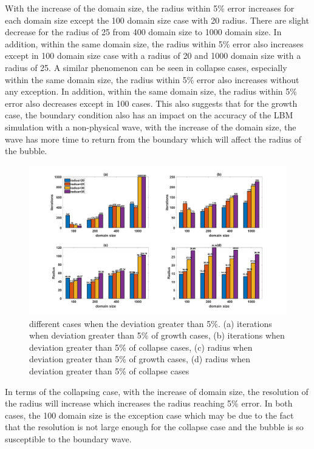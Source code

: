 \documentclass[review]{elsarticle}
\begin{document}
With the increase of the domain size, the radius within 5\% error increases for each domain size except the 100 domain size case with 20 radius. There are slight decrease for the radius of 25 from 400 domain size to 1000 domain size. In addition, within the same domain size, the radius within 5\% error also increases except in 100 domain size case with a radius of 20 and 1000 domain size with a radius of 25. 
A similar phenomenon can be seen in collapse cases, especially within the same domain size, the radius within 5\% error also increases without any exception. In addition, within the same domain size, the radius within 5\% error also decreases except in 100 cases. This also suggests that for the growth case, the boundary condition also has an impact on the accuracy of the LBM simulation with a non-physical wave, with the increase of the domain size, the wave has more time to return from the boundary which will affect the radius of the bubble.
 
\begin{figure}[htp]
	\centering
	\includegraphics[width=1\textwidth,height=0.5\textheight]{chart}
	\caption{different cases when the deviation greater than 5\%. (a) iterations when deviation greater than 5\% of growth cases, (b) iterations when deviation greater than 5\% of collapse cases, (c) radius when deviation greater than 5\% of growth cases, (d) radius when deviation greater than 5\% of collapse cases }
	\label{fig:chart}
\end{figure}
In terms of the collapsing case, with the increase of domain size, the resolution of the radius will increase which increases the radius reaching 5\% error. In both cases, the 100 domain size is the exception case which may be due to the fact that the resolution is not large enough for the collapse case and the bubble is so susceptible to the boundary wave.
\end{document}
